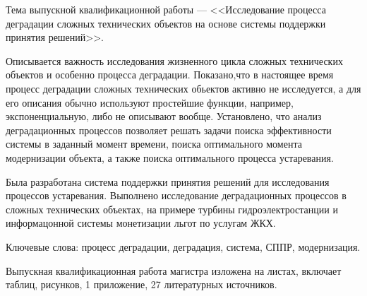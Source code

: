 
Тема выпускной квалификационной работы --- <<Исследование процесса деградации сложных технических объектов на основе системы поддержки принятия решений>>.

Описывается важность исследования жизненного цикла сложных технических объектов и особенно процесса деградации.
Показано,что в настоящее время процесс деградации сложных технических обьектов активно не исследуется, 
а для его описания обычно используют простейшие функции, например, экспоненциальную, либо не описывают вообще.
Установлено,  что анализ деградационных процессов позволяет решать задачи поиска эффективности системы в заданный момент времени, поиска оптимального момента модернизации объекта,
а также поиска оптимального процесса устаревания.

Была разработана система поддержки принятия решений для исследования процессов устаревания.
Выполнено исследование деградационных процессов в сложных технических объектах, на примере турбины гидроэлектростанции и информацонной системы монетизации льгот по услугам ЖКХ.

Ключевые слова: процесс деградации, деградация, система, СППР, модернизация.

Выпускная квалификационная работа магистра изложена на \pageref{LastPage} листах, включает \totaltables \hspace{0.25em} таблиц, 
\totalfigures \hspace{0.25em} рисунков, 1 приложение, 27 литературных источников.

\clearpage
